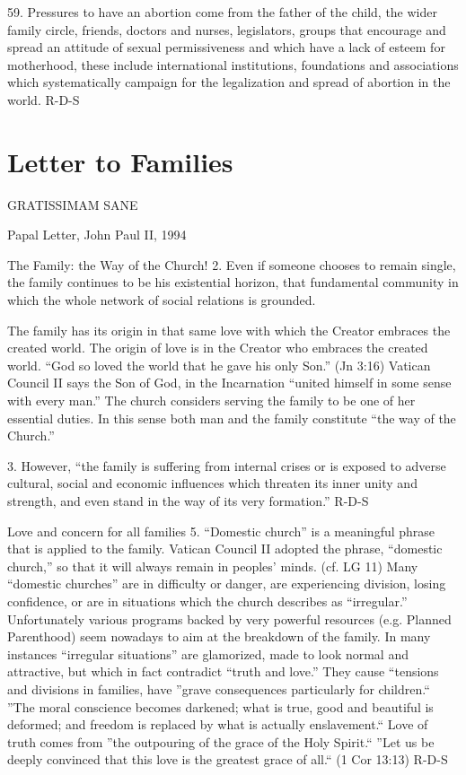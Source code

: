 \documentclass[oneside]{book}
\begin{document}
59. Pressures to have an abortion come from the father of the child, the wider
family circle, friends, doctors and nurses, legislators, groups that encourage
and spread an attitude of sexual permissiveness and which have a lack of esteem
for motherhood, these include international institutions, foundations and
associations which systematically campaign for the legalization and spread of
abortion in the world.
R-D-S


\chapter{Letter to Families}

GRATISSIMAM SANE

Papal Letter, John Paul II, 1994

The Family: the Way of the Church!
2. Even if someone chooses to remain single, the family continues to be his
existential horizon, that fundamental community in which the whole network of
social relations is grounded.

The family has its origin in that same love with which the Creator embraces the
created world. The origin of love is in the Creator who embraces the created
world. ``God so loved the world that he gave his only Son.'' (Jn 3:16) Vatican
Council II says the Son of God, in the Incarnation ``united himself in some
sense with every man.'' The church considers serving the family to be one of her
essential duties. In this sense both man and the family constitute ``the way of
the Church.''

3. However, ``the family is suffering from internal crises or is exposed to
adverse cultural, social and economic influences which threaten its inner unity
and strength, and even stand in the way of its very formation.''
R-D-S

Love and concern for all families
5. ``Domestic church'' is a meaningful phrase that is applied to the
family. Vatican Council II adopted the phrase, ``domestic church,'' so that it
will always remain in peoples' minds. (cf. LG 11) Many ``domestic churches'' are
in difficulty or danger, are experiencing division, losing confidence, or are in
situations which the church describes as ``irregular.'' Unfortunately various
programs backed by very powerful resources (e.g. Planned Parenthood) seem
nowadays to aim at the breakdown of the family. In many instances ``irregular
situations'' are glamorized, made to look normal and attractive, but which in
fact contradict ``truth and love.'' They cause ``tensions and divisions in
families, have ''grave consequences particularly for children.`` ''The moral
conscience becomes darkened; what is true, good and beautiful is deformed; and
freedom is replaced by what is actually enslavement.`` Love of truth comes from
''the outpouring of the grace of the Holy Spirit.`` ''Let us be deeply convinced
that this love is the greatest grace of all.`` (1 Cor 13:13)
R-D-S
\end{document}
